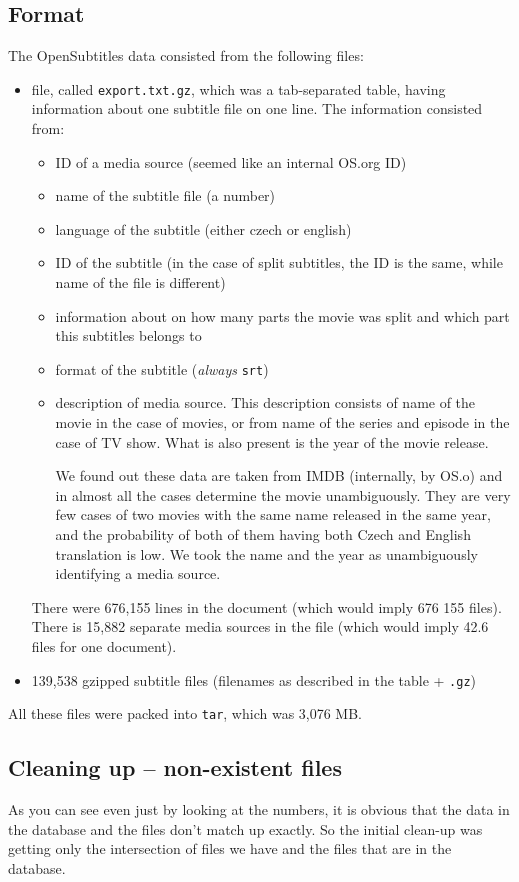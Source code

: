 \subsection*{Format}
The OpenSubtitles data consisted from the following files:
\begin{itemize}
    \item file, called \texttt{export.txt.gz}, which was a tab-separated table, having information about one subtitle file on one line. The information consisted from:
    \begin{itemize}
        \item ID of a media source (seemed like an internal OS.org ID)
        \item name of the subtitle file (a number)
        \item language of the subtitle (either czech or english)
        \item ID of the subtitle (in the case of split subtitles, the ID is the same, while name of the file is different)
        \item information about on how many parts the movie was split and which part this subtitles belongs to
        \item format of the subtitle (\emph{always} \texttt{srt})
        \item description of media source. This description consists of name of the movie in the case of movies, or from name of the series and episode in the case of TV show. What is also present is the year of the movie release.
        
         We found out these data are taken from IMDB (internally, by OS.o) and in almost all the cases determine the movie unambiguously. They are very few cases of two movies  with the same name released in the same year, and the probability of both of them having both Czech and English translation is low. We took the name and the year as unambiguously identifying a media source.
    \end{itemize}
    
    There were 676,155 lines in the document (which would imply 676 155 files). There is 15,882 separate media sources in the file (which would imply 42.6 files for one document).
    \item 139,538 gzipped subtitle files (filenames as described in the table + \texttt{.gz})
\end{itemize}
All these files were packed into \texttt{tar}, which was 3,076 MB.

\subsection*{Cleaning up -- non-existent files}
As you can see even just by looking at the numbers, it is obvious that the data in the database and the files don't match up exactly. So the initial clean-up was getting only the intersection of files we have and the files that are in the database. 

